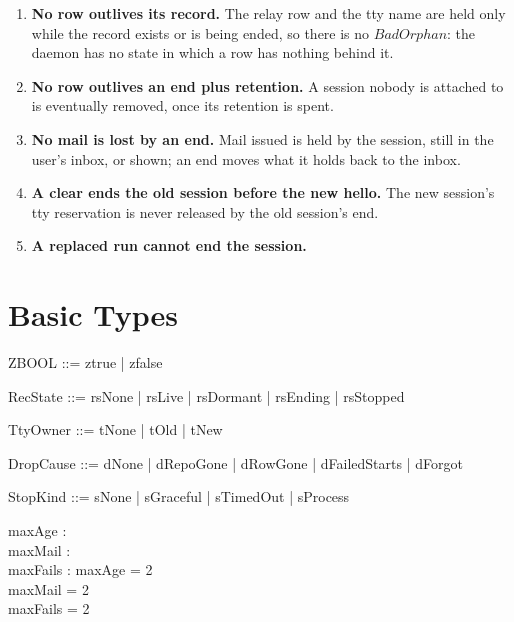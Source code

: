 \documentclass[a4paper,10pt,fleqn]{article}
\begin{document}
\begin{enumerate}
  \item \textbf{No row outlives its record.}  The relay row and the tty name are
    held only while the record exists or is being ended, so there is no
    $BadOrphan$: the daemon has no state in which a row has nothing behind it.
  \item \textbf{No row outlives an end plus retention.}  A session nobody is
    attached to is eventually removed, once its retention is spent.
  \item \textbf{No mail is lost by an end.}  Mail issued is held by the session,
    still in the user's inbox, or shown; an end moves what it holds back to the
    inbox.
  \item \textbf{A clear ends the old session before the new hello.}  The new
    session's tty reservation is never released by the old session's end.
  \item \textbf{A replaced run cannot end the session.}
\end{enumerate}

\section{Basic Types}

\begin{zed}
  ZBOOL ::= ztrue | zfalse
\end{zed}

\begin{zed}
  RecState ::= rsNone | rsLive | rsDormant | rsEnding | rsStopped
\end{zed}

\begin{zed}
  TtyOwner ::= tNone | tOld | tNew
\end{zed}

\begin{zed}
  DropCause ::= dNone | dRepoGone | dRowGone | dFailedStarts | dForgot
\end{zed}

\begin{zed}
  StopKind ::= sNone | sGraceful | sTimedOut | sProcess
\end{zed}

\begin{axdef}
  maxAge : \nat \\
  maxMail : \nat \\
  maxFails : \nat
  \where
  maxAge = 2 \\
  maxMail = 2 \\
  maxFails = 2
\end{axdef}
\end{document}
